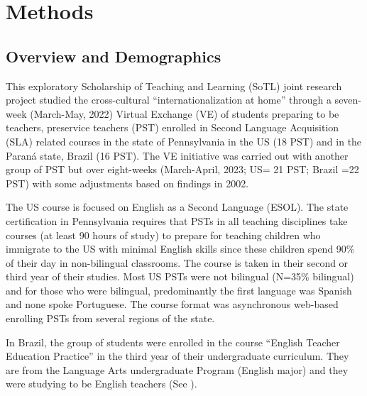 \section{Methods}\label{sec-methods}
\subsection{Overview and Demographics}\label{sub-sec-overviewanddemographics}

This exploratory Scholarship of Teaching and Learning (SoTL) joint
research project studied the cross-cultural \enquote{internationalization at
home} through a seven-week (March-May, 2022) Virtual Exchange (VE) of
students preparing to be teachers, preservice teachers (PST) enrolled in
Second Language Acquisition (SLA) related courses in the state of
Pennsylvania in the US (18 PST) and in the Paraná state, Brazil (16
PST). The VE initiative was carried out with another group of PST but
over eight-weeks (March-April, 2023; US= 21 PST; Brazil =22 PST) with
some adjustments based on findings in 2002.

The US course is focused on English as a Second Language (ESOL). The
state certification in Pennsylvania requires that PSTs in all teaching
disciplines take courses (at least 90 hours of study) to prepare for
teaching children who immigrate to the US with minimal English skills
since these children spend 90\% of their day in non-bilingual
classrooms. The course is taken in their second or third year of their
studies. Most US PSTs were not bilingual (N=35\% bilingual) and for
those who were bilingual, predominantly the first language was Spanish
and none spoke Portuguese. The course format was asynchronous web-based
enrolling PSTs from several regions of the state.

In Brazil, the group of students were enrolled in the course \enquote{English
Teacher Education Practice} in the third year of their undergraduate
curriculum. They are from the Language Arts undergraduate Program
(English major) and they were studying to be English teachers (See ).
		
		

